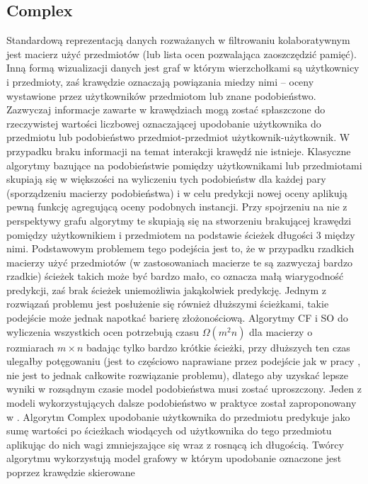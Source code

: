\documentclass{pracamgr}
\begin{document}
   \subsection{Complex}
    Standardową reprezentacją danych rozważanych w filtrowaniu kolaboratywnym jest macierz użyć przedmiotów (lub lista ocen pozwalająca zaoszczędzić pamięć).
    Inną formą wizualizacji danych jest graf w którym wierzchołkami są użytkownicy i przedmioty, zaś krawędzie oznaczają powiązania miedzy nimi
    -- oceny wystawione przez użytkowników przedmiotom lub znane podobieństwo. Zazwyczaj informacje zawarte w krawędziach mogą zostać spłaszczone do
    rzeczywistej wartości liczbowej oznaczającej upodobanie użytkownika do przedmiotu lub podobieństwo przedmiot-przedmiot użytkownik-użytkownik.
    W przypadku braku informacji na temat interakcji krawędź nie istnieje.
    Klasyczne algorytmy bazujące na podobieństwie pomiędzy użytkownikami lub przedmiotami skupiają się w większości na wyliczeniu tych podobieństw
    dla każdej pary (sporządzeniu macierzy podobieństwa) i w celu predykcji nowej oceny aplikują pewną funkcję agregującą oceny podobnych instancji.
    Przy spojrzeniu na nie z perspektywy grafu algorytmy te skupiają się na stworzeniu brakującej krawędzi pomiędzy użytkownikiem i przedmiotem na podstawie
    ścieżek długości 3 między nimi.\newline
    Podstawowym problemem tego podejścia jest to, że w przypadku rzadkich macierzy użyć przedmiotów (w zastosowaniach macierze te są zazwyczaj bardzo rzadkie)
    ścieżek takich może być bardzo mało, co oznacza małą wiarygodność predykcji, zaś brak ścieżek uniemożliwia jakąkolwiek predykcję.
    Jednym z rozwiązań problemu jest posłużenie się również dłuższymi ścieżkami, takie podejście może jednak napotkać barierę złożonościową.
    Algorytmy CF i SO do wyliczenia wszystkich ocen potrzebują czasu $\Omega(m^2n)$ dla macierzy o rozmiarach $m\times n$ badając tylko bardzo krótkie ścieżki,
    przy dłuższych ten czas ulegałby potęgowaniu
    (jest to częściowo naprawiane przez podejście jak w pracy \cite{221}, nie jest to jednak całkowite rozwiązanie problemu),
    dlatego aby uzyskać lepsze wyniki w rozsądnym czasie model podobieństwa musi zostać uproszczony.
    Jeden z modeli wykorzystujących dalsze podobieństwo w praktyce został zaproponowany w \cite{205}. Algorytm Complex upodobanie użytkownika do przedmiotu
    predykuje jako sumę wartości po ścieżkach wiodących od użytkownika do tego przedmiotu aplikując do nich wagi zmniejszające się wraz z rosnącą ich długością.
    Twórcy algorytmu wykorzystują model grafowy w którym upodobanie oznaczone jest poprzez krawędzie skierowane
\end{document}
